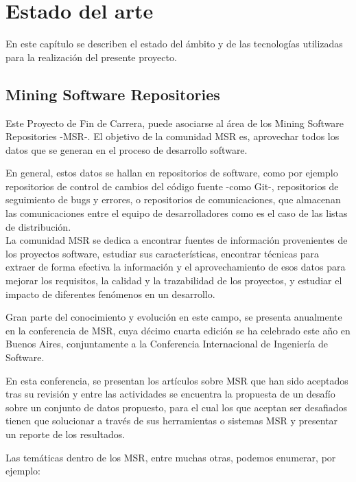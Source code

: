 \cleardoublepage
\chapter{Estado del arte}


En este capítulo se describen el estado del ámbito y de las tecnologías utilizadas para la realización del presente proyecto.


\section{Mining Software Repositories}

Este Proyecto de Fin de Carrera, puede asociarse al área de los Mining Software Repositories -MSR-. El objetivo de la comunidad MSR es, aprovechar todos los datos que se generan en el proceso de desarrollo software.


En general, estos datos se hallan en repositorios de software, como por ejemplo repositorios de control de cambios del código fuente -como Git-, repositorios de seguimiento de bugs y errores, o repositorios de comunicaciones, que almacenan las comunicaciones entre el equipo de desarrolladores como es el caso de las listas de distribución. \\

La comunidad MSR se dedica a encontrar fuentes de información provenientes de los proyectos software, estudiar sus características, encontrar técnicas para extraer de forma efectiva la información y el aprovechamiento de esos datos para mejorar los requisitos, la calidad y la trazabilidad de los proyectos, y estudiar el impacto de diferentes fenómenos en un desarrollo.


Gran parte del conocimiento y evolución en este campo, se presenta anualmente en la conferencia de MSR, cuya décimo cuarta edición se ha celebrado este año en Buenos Aires, conjuntamente a la Conferencia Internacional de Ingeniería de Software.


En esta conferencia, se presentan los artículos sobre MSR que han sido aceptados tras su revisión y entre las actividades se encuentra la propuesta de un desafío sobre un conjunto de datos propuesto, para el cual los que aceptan ser desafiados tienen que solucionar a través de sus herramientas o sistemas MSR y presentar un reporte de los resultados.


Las temáticas dentro de los MSR, entre muchas otras, podemos enumerar, por ejemplo:

